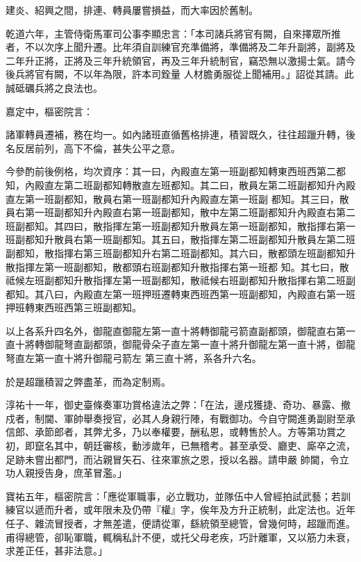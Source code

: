 \begin{pinyinscope}
 建炎、紹興之間，排連、轉員屢嘗損益，而大率因於舊制。



 乾道六年，主管侍衛馬軍司公事李顯忠言：「本司諸兵將官有闕，自來擇眾所推者，不以次序上聞升遷。比年須自訓練官充準備將，準備將及二年升副將，副將及二年升正將，正將及三年升統領官，再及三年升統制官，竊恐無以激揚士氣。請今後兵將官有闕，不以年為限，許本司銓量
 人材膽勇服從上聞補用。」詔從其請。此誠砥礪兵將之良法也。



 嘉定中，樞密院言：



 諸軍轉員遷補，務在均一。如內諸班直循舊格排連，積習既久，往往超躐升轉，後名反居前列，高下不倫，甚失公平之意。



 今參酌前後例格，均次資序：其一曰，內殿直左第一班副都知轉東西班西第二都知，內殿直左第二班副都知轉散直左班都知。其二曰，散員左第二班副都知升內殿直左第一班副都知，散員右第一班副都知升內殿直左第一班副
 都知。其三曰，散員右第一班副都知升內殿直右第一班副都知，散中左第二班副都知升內殿直右第二班副都知。其四曰，散指揮左第一班副都知升散員左第一班副都知，散指揮右第一班副都知升散員右第一班副都知。其五曰，散指揮左第二班副都知升散員左第二班副都知，散指揮右第三班副都知升右第二班副都知。其六曰，散都頭左班副都知升散指揮左第一班副都知，散都頭右班副都知升散指揮右第一班都
 知。其七曰，散祗候左班副都知升散指揮左第一班副都知，散祗候右班副都知升散指揮右第二班副都知。其八曰，內殿直左第一班押班遷轉東西班西第一班副都知，內殿直右第一班押班轉東西班西第三班副都知。



 以上各系升四名外，御龍直御龍左第一直十將轉御龍弓箭直副都頭，御龍直右第一直十將轉御龍弩直副都頭，御龍骨朵子直左第一直十將升御龍左第一直十將，御龍弩直左第一直十將升御龍弓箭左
 第三直十將，系各升六名。



 於是超躐積習之弊盡革，而為定制焉。



 淳祐十一年，御史臺條奏軍功賞格違法之弊：「在法，邊戍獲捷、奇功、暴露、撤戍者，制閫、軍帥舉奏授官，必其人身親行陣，有戰御功。今自守闕進勇副尉至承信郎、承節郎者，其弊尤多，乃以奉權要，酬私恩，或轉售於人。方等第功賞之初，即竄名其中，朝廷審核，動涉歲年，已無稽考。甚至承受、廳吏、廝卒之流，足跡未嘗出都門，而沾親冒矢石、往來軍旅之恩，授以名器。請申嚴
 帥閫，令立功人親授告身，庶革冒濫。」



 寶祐五年，樞密院言：「應從軍職事，必立戰功，並隊伍中人曾經拍試武藝；若訓練官以遞而升者，或年限未及仍帶『權』字，俟年及方升正統制，此定法也。近年任子、雜流冒授者，才無差遣，便請從軍，繇統領至總管，曾幾何時，超躐而進。甫得總管，卻恥軍職，輒稱私計不便，或托父母老疾，巧計離軍，又以筋力未衰，求差正任，甚非法意。」




\end{pinyinscope}
